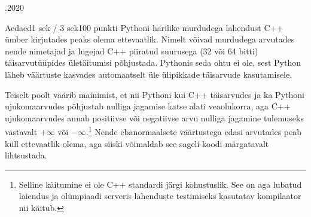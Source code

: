 \documentclass[a4paper,11pt]{article}
\begin{document}
\begin{ol}{\eio}{.2020}{\lah}{}
\begin{yl}{1}{Aed}{aed}{1 sek / 3 sek}{100 punkti}
Pythoni harilike murdudega lahendust C++ ümber kirjutades peaks olema ettevaatlik. Nimelt võivad murdudega arvutades nende nimetajad ja lugejad C++ piiratud suurusega (32 või 64 bitti) täisarvutüüpides ületäitumisi põhjustada. Pythonis seda ohtu ei ole, sest Python läheb väärtuste kasvades automaatselt üle ülipikkade täisarvude kasutamisele.

Teiselt poolt väärib mainimist, et nii Pythoni kui C++ täisarvudes ja ka Pythoni ujukomaarvudes põhjustab nulliga jagamise katse alati veaolukorra, aga C++ ujukomaarvudes annab positiivse või negatiivse arvu nulliga jagamine tulemuseks vastavalt $+\infty$ või $-\infty$.\footnote{Selline käitumine ei ole C++ standardi järgi kohustuslik. See on aga lubatud laiendus ja olümpiaadi serveris lahenduste testimiseks kasutatav kompilaator nii käitub.} Nende ebanormaalsete väärtustega edasi arvutades peab küll ettevaatlik olema, aga siiski võimaldab see sageli koodi märgatavalt lihtsustada.

\end{yl}
\end{ol}
\end{document}
